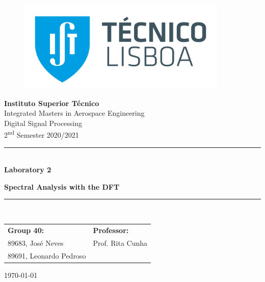 \documentclass[a4paper, oneside, 11pt]{article}
\begin{document}
\begin{titlepage}
	\begin{center}
		\begin{figure}[htb!]
			\centering
				\includegraphics[width=10cm]{figures/istlogo.jpg}
		\end{figure}
        
        \LARGE{\textbf{Instituto Superior Técnico}}\\
        \vspace{20pt}
        \Large{Integrated Masters in Aerospace Engineering}\\
        \vspace{10pt}
        \Large{Digital Signal Processing}\\
        \vspace{10pt}
        \Large{2\textsuperscript{nd} Semester 2020/2021}\\
            
        \vspace{40pt}
        \noindent\rule{15cm}{1pt}\\
        \Huge{\center \textbf{Laboratory 2}} 
        \par 
        \Huge{\center \textbf{Spectral Analysis with the DFT}}\\
        \noindent\rule{15cm}{1pt}\\
        
        \vspace{60pt}
        \large{\begin{tabular}{ll}
            \textbf{Group 40:} & \textbf{Professor:} \\
            89683, José Neves & Prof. Rita Cunha\\
            89691, Leonardo Pedroso \hspace{1cm} & \\
        \end{tabular}}
    
        \vspace{60pt}
        \large{\today}
	\end{center}
\end{titlepage}
\end{document}

